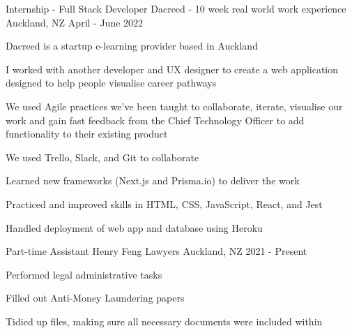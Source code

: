 

\begin{cventries}
  \cventry
    {Internship - Full Stack Developer} %
    {Dacreed - 10 week real world work experience} %
    {Auckland, NZ} %
    {April - June 2022} %
    {
      \begin{cvitems} %
        \item {Dacreed is a startup e-learning provider based in Auckland}
        \item {I worked with another developer and UX designer to create a web application designed to help people visualise career pathways}
        \item {We used Agile practices we've been taught to collaborate, iterate, visualise our work and gain fast feedback from the Chief Technology Officer to add functionality to their existing product}
        \item {We used Trello, Slack, and Git to collaborate}
        \item {Learned new frameworks (Next.js and Prisma.io) to deliver the work}
        \item {Practiced and improved skills in HTML, CSS, JavaScript, React, and Jest}
        \item {Handled deployment of web app and database using Heroku}
      \end{cvitems}
    }

  \cventry
    {Part-time Assistant} %
    {Henry Feng Lawyers} %
    {Auckland, NZ} %
    {2021 - Present} %
    {
      \begin{cvitems} %
        \item {Performed legal administrative tasks}
        \item {Filled out Anti-Money Laundering papers}
        \item {Tidied up files, making sure all necessary documents were included within}
      \end{cvitems}
    }


\end{cventries}
